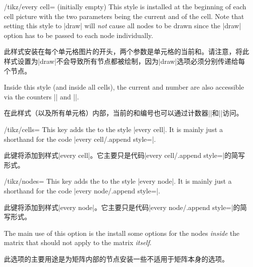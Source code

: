 \begin{stylekey}{/tikz/every cell= (initially \normalfont empty)}
    This style is installed at the beginning of each cell picture with the two
    parameters being the current  and  of the cell. Note
    that setting this style to |draw| will \emph{not} cause all nodes to be
    drawn since the |draw| option has to be passed to each node individually.

    此样式安装在每个单元格图片的开头，两个参数是单元格的当前和。请注意，将此样式设置为|draw|不会导致所有节点都被绘制，因为|draw|选项必须分别传递给每个节点。

    Inside this style (and inside all cells), the current  and
     number are also accessible via the counters
    |\pgfmatrixcurrentrow| and |\pgfmatrixcurrentcolumn|.

    在此样式（以及所有单元格）内部，当前的和编号也可以通过计数器|\pgfmatrixcurrentrow|和|\pgfmatrixcurrentcolumn|访问。

  \end{stylekey}

\begin{key}{/tikz/cells=}
    This key adds the  to the style |every cell|. It is mainly
    just a shorthand for the code |every cell/.append style=|.

    此键将添加到样式|every cell|。它主要只是代码|every cell/.append style=|的简写形式。

  \end{key}

\begin{key}{/tikz/nodes=}
    This key adds the  to the style |every node|. It is mainly
    just a shorthand for the code |every node/.append style=|.

    此键将添加到样式|every node|。它主要只是代码|every node/.append style=|的简写形式。

    The main use of this option is the install some options for the nodes
    \emph{inside} the matrix that should not apply to the matrix \emph{itself}.

    此选项的主要用途是为矩阵内部的节点安装一些不适用于矩阵本身的选项。

\begin{codeexample}[]
\end{codeexample}
\end{key}

